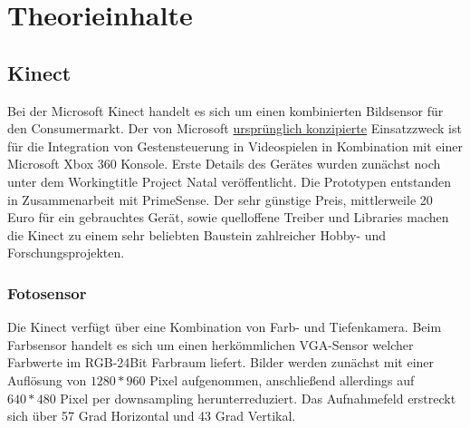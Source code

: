 
\chapter{Theorieinhalte}
	\section{Kinect}
	Bei der Microsoft Kinect handelt es sich um einen kombinierten Bildsensor für den Consumermarkt. Der von Microsoft \underline{ursprünglich konzipierte} Einsatzzweck ist für die Integration von Gestensteuerung in Videospielen in Kombination mit einer Microsoft Xbox 360 Konsole. Erste Details des Gerätes wurden zunächst noch unter dem Workingtitle Project Natal veröffentlicht. Die Prototypen entstanden in Zusammenarbeit mit PrimeSense. Der sehr günstige Preis, mittlerweile 20 Euro für ein gebrauchtes Gerät, sowie quelloffene Treiber und Libraries machen die Kinect zu einem sehr beliebten Baustein zahlreicher Hobby- und Forschungsprojekten.
		\subsection{Fotosensor}
		Die Kinect verfügt über eine Kombination von Farb- und Tiefenkamera. Beim Farbsensor handelt es sich um einen herkömmlichen VGA-Sensor welcher Farbwerte im RGB-24Bit Farbraum liefert. Bilder werden zunächst mit einer Auflösung von $1280*960$ Pixel aufgenommen, anschließend allerdings auf $640*480$ Pixel per downsampling herunterreduziert. Das Aufnahmefeld erstreckt sich über 57 Grad Horizontal und 43 Grad Vertikal.
			\cite{kinect-georg}
